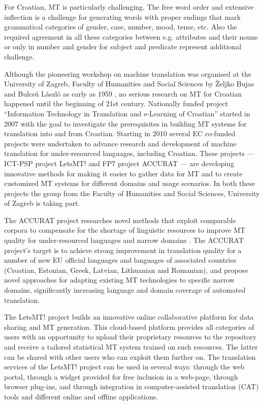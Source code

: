 \begin{multicols}{2}
For Croatian, MT is particularly challenging. The free word order and extensive inflection is a challenge for generating words with proper endings that mark grammatical categories of gender, case, number, mood, tense, etc. Also the required agreement in all these categories between e.g. attributes and their nouns or only in number and gender for subject and predicate represent additional challenge.

Although the pioneering workshop on machine translation was organised at the University of Zagreb, Faculty of Humanities and Social Sciences by Željko Bujas and Bulcsú László as early as 1959 \cite{art4}, no serious research on MT for Croatian happened until the beginning of 21st century. Nationally funded project “Information Technology in Translation and e-Learning of Croatian” \cite{str22} started in 2007 with the goal to investigate the prerequisites in building MT systems for translation into and from Croatian. Starting in 2010 several EC co-funded projects were undertaken to advance research and development of machine translation for under-resourced languages, including Croatian. These projects — ICT-PSP project LetsMT! \cite{str23} and FP7 project ACCURAT \cite{str24} — are developing innovative methods for making it easier to gather data for MT and to create customized MT systems for different domains and usage scenarios. In both these projects the group from the Faculty of Humanities and Social Sciences, University of Zagreb is taking part.

The ACCURAT project \cite{pro3} researches novel methods that exploit comparable corpora to compensate for the shortage of linguistic resources to improve MT quality for under-resourced languages and narrow domains \cite{pro4}. The ACCURAT project’s target is to achieve strong improvement in translation quality for a number of new EU official languages and languages of associated countries (Croatian, Estonian, Greek, Latvian, Lithuanian and Romanian), and propose novel approaches for adapting existing MT technologies to specific narrow domains, significantly increasing language and domain coverage of automated translation.

The LetsMT! project \cite{pro5} builds an innovative online collaborative platform for data sharing and MT generation. This cloud-based platform provides all categories of users with an opportunity to upload their proprietary resources to the repository and receive a tailored statistical MT system trained on such resources. The latter can be shared with other users who can exploit them further on. The translation services of the LetsMT! project can be used in several ways: through the web portal, through a widget provided for free inclusion in a web-page, through browser plug-ins, and through integration in computer-assisted translation (CAT) tools and different online and offline applications.


\end{multicols}
